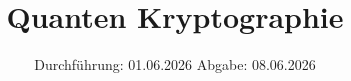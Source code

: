 

\subject{v29}
\title{Quanten Kryptographie}
\date{%
  Durchführung: 01.06.2026
  \hspace{3em}
  Abgabe: 08.06.2026
}



\maketitle
\thispagestyle{empty}
\tableofcontents
\newpage






\printbibliography{}


